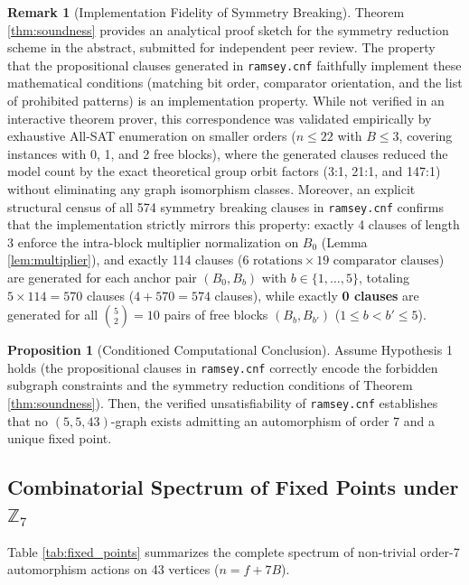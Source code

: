 \documentclass[11pt,a4paper]{article}
\theoremstyle{definition}
\newtheorem{proposition}{Proposition}
\newtheorem{remark}{Remark}
\begin{document}
\begin{remark}[Implementation Fidelity of Symmetry Breaking]
Theorem \ref{thm:soundness} provides an analytical proof sketch for the symmetry reduction scheme in the abstract, submitted for independent peer review. The property that the propositional clauses generated in \texttt{ramsey.cnf} faithfully implement these mathematical conditions (matching bit order, comparator orientation, and the list of prohibited patterns) is an implementation property. While not verified in an interactive theorem prover, this correspondence was validated empirically by exhaustive All-SAT enumeration on smaller orders ($n \le 22$ with $B \le 3$, covering instances with 0, 1, and 2 free blocks), where the generated clauses reduced the model count by the exact theoretical group orbit factors (3:1, 21:1, and 147:1) without eliminating any graph isomorphism classes.
Moreover, an explicit structural census of all 574 symmetry breaking clauses in \texttt{ramsey.cnf} confirms that the implementation strictly mirrors this property: exactly 4 clauses of length 3 enforce the intra-block multiplier normalization on $B_0$ (Lemma \ref{lem:multiplier}), and exactly 114 clauses ($6 \text{ rotations} \times 19 \text{ comparator clauses}$) are generated for each anchor pair $(B_0, B_b)$ with $b \in \{1, \dots, 5\}$, totaling $5 \times 114 = 570$ clauses ($4 + 570 = 574$ clauses), while exactly \textbf{0 clauses} are generated for all $\binom{5}{2} = 10$ pairs of free blocks $(B_b, B_{b'})$ ($1 \le b < b' \le 5$).
\end{remark}

\begin{proposition}[Conditioned Computational Conclusion]
Assume Hypothesis 1 holds (the propositional clauses in \texttt{ramsey.cnf} correctly encode the forbidden subgraph constraints and the symmetry reduction conditions of Theorem \ref{thm:soundness}). Then, the verified unsatisfiability of \texttt{ramsey.cnf} establishes that no $(5,5,43)$-graph exists admitting an automorphism of order 7 and a unique fixed point.
\end{proposition}

\subsection{Combinatorial Spectrum of Fixed Points under \texorpdfstring{$\mathbb{Z}_7$}{Z7}}

Table \ref{tab:fixed_points} summarizes the complete spectrum of non-trivial order-7 automorphism actions on 43 vertices ($n = f + 7B$).
\end{document}
